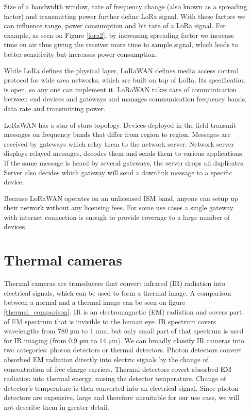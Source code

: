 Size of a bandwidth window, rate of frequency change (also known as a spreading factor) and transmitting power further define LoRa signal.
With these factors we can influence range, power consumption and bit rate of a LoRa signal.
For example, as seen on Figure \ref{lora2}, by increasing spreading factor we increase time on air thus giving the receiver more time to sample signal, which leads to better sensitivity but increases power consumption.

While LoRa defines the physical layer, LoRaWAN defines media access control protocol for wide area networks, which are built on top of LoRa\cite{lora_article}.
Its specification is open, so any one can implement it.
LoRaWAN takes care of communication between end devices and gateways and manages communication frequency bands, data rate and transmitting power.

LoRaWAN has a star of stars topology\cite{lora_article}.
Devices deployed in the field transmit messages on frequency bands that differ from region to region. 
Messages are received by gateways which relay them to the network server.
Network server displays relayed messages, decodes them and sends them to various applications.
If the same message is heard by several gateways, the server drops all duplicates.
Server also decides which gateway will send a downlink message to a specific device. 

Because LoRaWAN operates on an unlicensed ISM band, anyone can setup up their network without any licensing fees.
For some use cases a single gateway with internet connection is enough to provide coverage to a large number of devices.


\section{ Thermal cameras}

Thermal cameras are transducers that convert infrared (IR) radiation into electrical signals, which can be used to form a thermal image.
A comparison between a normal and a thermal image can be seen on figure \ref{thermal_comparison}.
IR is an electromagnetic (EM) radiation and covers part of EM spectrum that is invisible to the human eye.
IR spectrum covers wavelengths from 780 \si{\micro\meter} to 1 \si{\milli\meter}, but only small part of that spectrum is used for IR imaging (from 0.9 \si{\micro\meter} to 14 \si{\micro\meter})\cite{thermal_book}.
We can broadly classify IR cameras into two categories: photon detectors or thermal detectors\cite{thermal_book}.
Photon detectors convert absorbed EM radiation directly into electric signals by the change of concentration of free charge carriers\cite{thermal_book}.
Thermal detectors covert absorbed EM radiation into thermal energy, raising the detector temperature\cite{thermal_book}. 
Change of detector's temperature is then converted into an electrical signal.
Since photon detectors are expensive, large and therefore unsuitable for our use case, we will not describe them in greater detail.
\newline 

